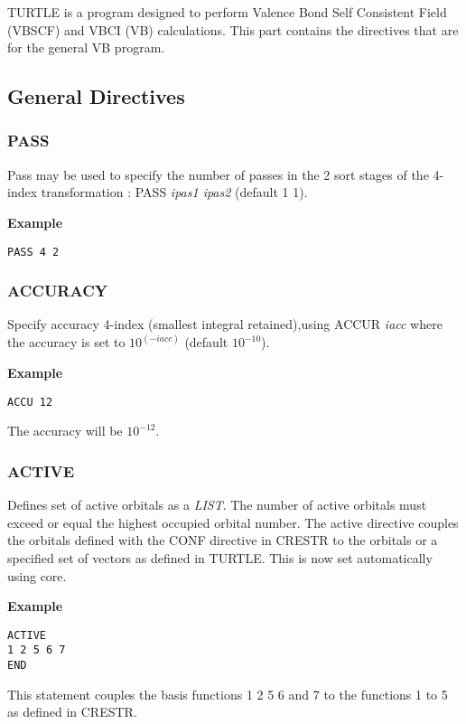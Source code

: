 \documentclass[11pt,fleqn]{article}
\begin{document}
TURTLE is a program designed to perform Valence Bond Self Consistent
Field (VBSCF) and VBCI (VB) calculations. 
This part contains the directives that are for the general VB program.

\subsection{General Directives}

\subsubsection{PASS}

Pass may be used to specify the number of passes in the 2 sort stages
of the 4-index transformation : PASS \emph{ipas1 ipas2} (default 1 1).

{\bf Example }
\begin{verbatim}
PASS 4 2
\end{verbatim}

\subsubsection{ACCURACY}

Specify accuracy 4-index (smallest integral retained),using
ACCUR \emph{iacc}  where the accuracy is set to $10^{(-iacc)}$ (default $10^{-10}$).

{\bf Example }
\begin{verbatim}
ACCU 12
\end{verbatim}

The accuracy will be $10^{-12}$.

\subsubsection{ACTIVE}

Defines set of active orbitals as a  \textit{LIST}. The number of active orbitals must exceed
or equal the highest occupied orbital number. The active directive couples
the orbitals defined with the CONF directive in CRESTR to the orbitals or a
specified set of vectors as defined in TURTLE. This is now set automatically using core.

{\bf Example } 
\begin{verbatim}
ACTIVE
1 2 5 6 7  
END
\end{verbatim}

This statement couples the basis functions 1 2 5 6 and 7 to the functions
1 to 5 as defined in CRESTR. 
\end{document}
